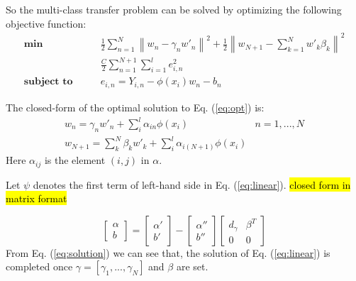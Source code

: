 So the multi-class transfer problem can be solved by optimizing the following objective function:
\begin{equation}\label{eq:opt}
\begin{aligned}
\textbf{min}\qquad {} & \frac{1}{2}\sum\limits_{n = 1}^N {{{\left\| {{w_n} - {\gamma _n}{{w'}_n}} \right\|}^2}}  + \frac{1}{2}{\left\| {{w_{N + 1}} - \sum\limits_{k = 1}^N {w{'_k}{\beta _k}} } \right\|^2}\\& \frac{C}{2}\sum\limits_{n = 1}^{N + 1} {\sum\limits_{i = 1}^l {e_{i,n}^2} }  \\
\textbf{subject to}\qquad {} &{e_{i,n}} = {Y_{i,n}} - \phi ({x_i}){w_n} - {b_n}
\end{aligned}
\end{equation}

The closed-form of the optimal solution to  Eq. (\ref{eq:opt}) is:
\begin{equation*}
\begin{array}{*{20}{c}}
{{w_n} = {\gamma _n}{{w'}_n} + \sum\limits_i^l {{\alpha _{in}}{\phi(x_i)}} }&{n = 1,...,N}\\
{{w_{N + 1}} = \sum\limits_k^N {{\beta _k}{{w'}_k}}  + \sum\limits_i^l {{\alpha _{i(N + 1)}}{\phi(x_i)}} }&{}
\end{array}
\end{equation*}
Here $\alpha_{ij}$ is the element $(i,j)$ in $\alpha$.

Let $\psi$ denotes the first term of left-hand side in Eq. (\ref{eq:linear}). \hl{closed form in matrix format}

\begin{equation}\label{eq:solution}
  \left[ {\begin{array}{*{20}{c}}
\alpha \\
b
\end{array}} \right] = \left[ {\begin{array}{*{20}{c}}
{\alpha '}\\
{b'}
\end{array}} \right] - \left[ {\begin{array}{*{20}{c}}
{\alpha ''}\\
{b''}
\end{array}} \right]\left[ {\begin{array}{*{20}{c}}
{d_\gamma }&{{\beta ^T}}\\
0&0
\end{array}} \right]
\end{equation}
From Eq. (\ref{eq:solution}) we can see that, the solution of Eq. (\ref{eq:linear}) is completed once $\gamma=\left[ \gamma_1,...,\gamma_N\right] $ and $\beta$ are set.


